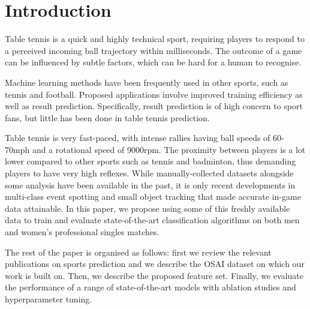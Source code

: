 \section{Introduction}
Table tennis is a quick and highly technical sport, requiring players to respond to a perceived incoming ball trajectory within milliseconds. The  outcome of a game can be influenced by subtle factors, which can be hard for a human to recognise. 

Machine learning methods have been frequently used in other sports, such as tennis and football. Proposed applications involve improved training efficiency 
as well as result prediction. Specifically, result prediction is of high concern to sport fans, but little has been done in table tennis prediction.

Table tennis is very fast-paced, with intense rallies having ball speeds of 60-70mph and a rotational speed of 9000rpm. The proximity between players is a lot lower compared to other sports such as tennis and badminton, thus demanding players to have very high reflexes.
While manually-collected datasets alongside some analysis have been available in the past\cite{wang2019tac}, it is only recent developments in  multi-class event spotting and small object tracking that made accurate in-game data attainable.
In this paper, we propose using some of this freshly available data to train and evaluate  state-of-the-art classification algorithms on both men and women's professional singles matches. %



The rest of the paper is organised as follows: first we review the relevant publications on sports prediction and we describe the OSAI dataset on which our work is built on. Then, we describe the proposed feature set. Finally, we evaluate the performance of a range of state-of-the-art models with ablation studies and hyperparameter tuning.